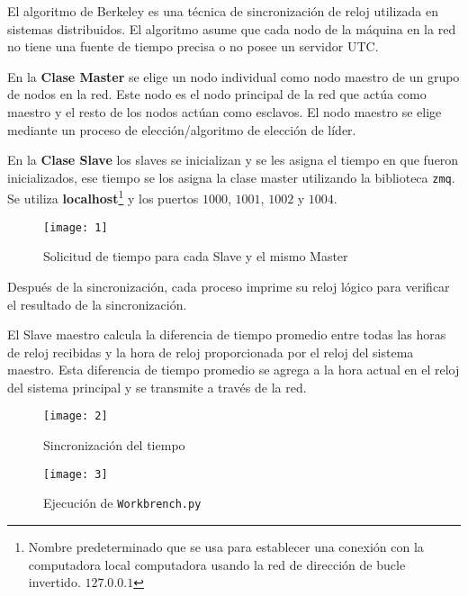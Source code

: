 El algoritmo de Berkeley es una técnica de sincronización de reloj utilizada en
sistemas distribuidos. El algoritmo asume que cada nodo de la máquina en la red
no tiene una fuente de tiempo precisa o no posee un servidor UTC.\@

En la \textbf{Clase Master} se elige un nodo individual como nodo maestro de un
grupo de nodos en la red. Este nodo es el nodo principal de la red que actúa
como maestro y el resto de los nodos actúan como esclavos. El nodo maestro se
elige mediante un proceso de elección/algoritmo de elección de líder.

En la \textbf{Clase Slave} los slaves se inicializan y se les asigna el tiempo
en que fueron inicializados, ese tiempo se los asigna la clase master utilizando
la biblioteca \texttt{zmq}.
Se utiliza \textbf{localhost}\footnote{Nombre predeterminado que se usa para establecer
  una conexión con la computadora local computadora usando la red de dirección
  de bucle invertido. $127.0.0.1$} y los puertos $1000$, $1001$, $1002$ y $1004$.

\begin{figure}[H]
  \centering
  \texttt{[image: 1]}
  \caption{Solicitud de tiempo para cada Slave y el mismo Master}\label{fig:1}
\end{figure}

Después de la sincronización, cada proceso imprime su reloj lógico para
verificar el resultado de la sincronización.

El Slave maestro calcula la diferencia de tiempo promedio entre todas las horas
de reloj recibidas y la hora de reloj proporcionada por el reloj del sistema
maestro. Esta diferencia de tiempo promedio se agrega a la hora actual en el
reloj del sistema principal y se transmite a través de la red.

\begin{figure}[H]
  \centering
  \texttt{[image: 2]}
  \caption{Sincronización del tiempo}\label{fig:2}
\end{figure}

\begin{figure}[H]
  \centering
  \texttt{[image: 3]}
  \caption{Ejecución de \texttt{Workbrench.py}}\label{fig:3}
\end{figure}
